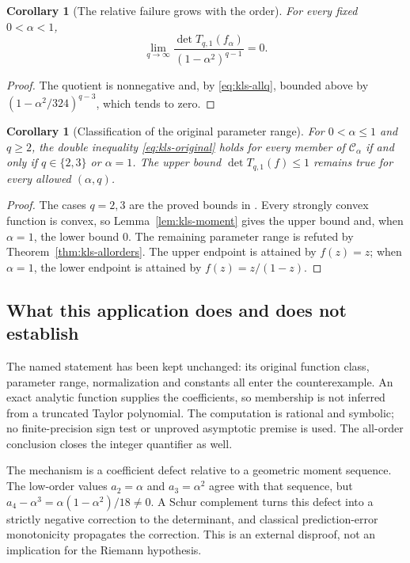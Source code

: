 \documentclass[11pt,a4paper]{article}
\numberwithin{equation}{section}
\newtheorem{corollary}[theorem]{Corollary}
\theoremstyle{definition}\newtheorem{definition}[theorem]{Definition}
\theoremstyle{remark}\newtheorem{remark}[theorem]{Remark}
\begin{document}
\begin{corollary}[The relative failure grows with the order]
\label{cor:kls-relative}
For every fixed $0<\alpha<1$,
\[
 \lim_{q\to\infty}
 \frac{\det T_{q,1}(f_\alpha)}{(1-\alpha^2)^{q-1}}=0.
\]
\end{corollary}
\begin{proof}
The quotient is nonnegative and, by \eqref{eq:kls-allq}, bounded
above by $(1-\alpha^2/324)^{q-3}$, which tends to zero.
\end{proof}

\begin{corollary}[Classification of the original parameter range]
\label{cor:kls-parameter}
For $0<\alpha\leq1$ and $q\geq2$, the double inequality
\eqref{eq:kls-original} holds for every member of
$\mathcal C_\alpha$ if and only if $q\in\{2,3\}$ or $\alpha=1$.
The upper bound $\det T_{q,1}(f)\leq1$ remains true for every
allowed $(\alpha,q)$.
\end{corollary}

\begin{proof}
The cases $q=2,3$ are the proved bounds in
\cite[Theorems~4 and~5]{KLS2021}.  Every strongly convex function
is convex, so Lemma~\ref{lem:kls-moment} gives the upper bound
and, when $\alpha=1$, the lower bound $0$.  The remaining parameter
range is refuted by Theorem~\ref{thm:kls-allorders}. The upper
endpoint is attained by $f(z)=z$; when $\alpha=1$, the lower
endpoint is attained by $f(z)=z/(1-z)$.
\end{proof}

\subsection{What this application does and does not establish}

The named statement has been kept unchanged: its original function
class, parameter range, normalization and constants all enter the
counterexample.  An exact analytic function supplies the coefficients,
so membership is not inferred from a truncated Taylor polynomial.
The computation is rational and symbolic; no finite-precision sign
test or unproved asymptotic premise is used.  The all-order conclusion
closes the integer quantifier as well.

The mechanism is a coefficient defect relative to a geometric
moment sequence.  The low-order values $a_2=\alpha$ and
$a_3=\alpha^2$ agree with that sequence, but
$a_4-\alpha^3=\alpha(1-\alpha^2)/18\ne0$.  A Schur complement
turns this defect into a strictly negative correction to the
determinant, and classical prediction-error monotonicity propagates
the correction.  This is an external disproof, not an implication
for the Riemann hypothesis.
\end{document}
